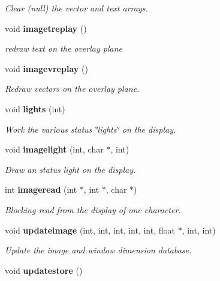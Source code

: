 \begin{CompactItemize}
\begin{CompactList}\small\item\em Clear (null) the vector and text arrays. \item\end{CompactList}\item 
void {\bf imagetreplay} ()\label{xtv_8h_a78}

\begin{CompactList}\small\item\em redraw text on the overlay plane \item\end{CompactList}\item 
void {\bf imagevreplay} ()\label{xtv_8h_a79}

\begin{CompactList}\small\item\em Redraw vectors on the overlay plane. \item\end{CompactList}\item 
void {\bf lights} (int)
\begin{CompactList}\small\item\em Work the various status \char`\"{}lights\char`\"{} on the display. \item\end{CompactList}\item 
void {\bf imagelight} (int, char $\ast$, int)
\begin{CompactList}\small\item\em Draw an status light on the display. \item\end{CompactList}\item 
int {\bf imageread} (int $\ast$, int $\ast$, char $\ast$)
\begin{CompactList}\small\item\em Blocking read from the display of one character. \item\end{CompactList}\item 
void {\bf updateimage} (int, int, int, int, int, float $\ast$, int, int)
\begin{CompactList}\small\item\em Update the image and window dimension database. \item\end{CompactList}\item 
void {\bf updatestore} ()\label{xtv_8h_a84}


\end{CompactItemize}
